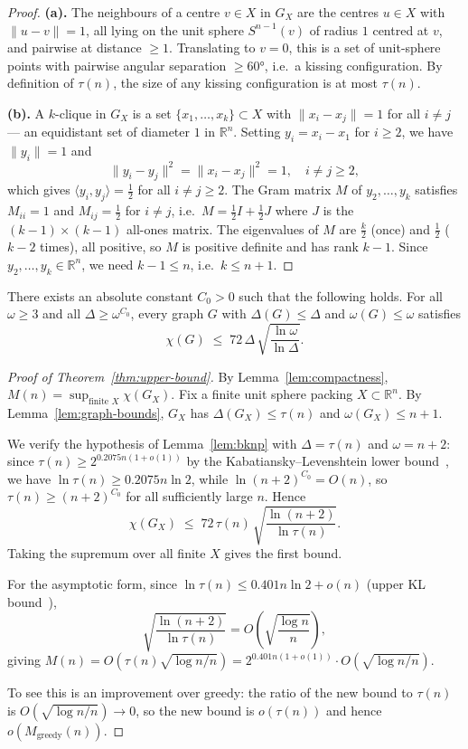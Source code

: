 \begin{proof}
\textbf{(a).} The neighbours of a centre $v\in X$ in $G_X$ are the centres $u\in X$ with $\|u-v\|=1$, all lying on the unit sphere $S^{n-1}(v)$ of radius $1$ centred at $v$, and pairwise at distance $\ge 1$.  Translating to $v=0$, this is a set of unit-sphere points with pairwise angular separation $\ge 60°$, i.e.\ a kissing configuration.  By definition of $\tau(n)$, the size of any kissing configuration is at most $\tau(n)$.

\textbf{(b).} A $k$-clique in $G_X$ is a set $\{x_1,\ldots,x_k\}\subset X$ with $\|x_i-x_j\|=1$ for all $i\ne j$ — an equidistant set of diameter $1$ in $\mathbb{R}^n$.  Setting $y_i=x_i-x_1$ for $i\ge 2$, we have $\|y_i\|=1$ and
\[
  \|y_i-y_j\|^2 = \|x_i-x_j\|^2 = 1, \quad i\ne j\ge 2,
\]
which gives $\langle y_i,y_j\rangle = \tfrac{1}{2}$ for all $i\ne j\ge 2$.  The Gram matrix $M$ of $y_2,\ldots,y_k$ satisfies $M_{ii}=1$ and $M_{ij}=\tfrac{1}{2}$ for $i\ne j$, i.e.\ $M=\tfrac{1}{2}I+\tfrac{1}{2}J$ where $J$ is the $(k-1)\times(k-1)$ all-ones matrix.  The eigenvalues of $M$ are $\tfrac{k}{2}$ (once) and $\tfrac{1}{2}$ ($k-2$ times), all positive, so $M$ is positive definite and has rank $k-1$.  Since $y_2,\ldots,y_k\in\mathbb{R}^n$, we need $k-1\le n$, i.e.\ $k\le n+1$.
\end{proof}

\begin{lemma}\label{lem:bknp}
There exists an absolute constant $C_0>0$ such that the following holds.  For all $\omega\ge 3$ and all $\Delta\ge \omega^{C_0}$, every graph $G$ with $\Delta(G)\le\Delta$ and $\omega(G)\le\omega$ satisfies
\[
  \chi(G)\;\le\; 72\,\Delta\,\sqrt{\frac{\ln\omega}{\ln\Delta}}.
\]
\end{lemma}

\begin{proof}[Proof of Theorem~\ref{thm:upper-bound}]
By Lemma~\ref{lem:compactness}, $M(n)=\sup_{\text{finite }X}\chi(G_X)$.  Fix a finite unit sphere packing $X\subset\mathbb{R}^n$.  By Lemma~\ref{lem:graph-bounds}, $G_X$ has $\Delta(G_X)\le\tau(n)$ and $\omega(G_X)\le n+1$.

We verify the hypothesis of Lemma~\ref{lem:bknp} with $\Delta=\tau(n)$ and $\omega=n+2$: since $\tau(n)\ge 2^{0.2075n(1+o(1))}$ by the Kabatiansky--Levenshtein lower bound~\cite{KL1978}, we have $\ln\tau(n)\ge 0.2075n\ln 2$, while $\ln(n+2)^{C_0}=O(n)$, so $\tau(n)\ge(n+2)^{C_0}$ for all sufficiently large $n$.  Hence
\[
  \chi(G_X) \;\le\; 72\,\tau(n)\,\sqrt{\frac{\ln(n+2)}{\ln\tau(n)}}.
\]
Taking the supremum over all finite $X$ gives the first bound.

For the asymptotic form, since $\ln\tau(n)\le 0.401n\ln 2+o(n)$ (upper KL bound~\cite{KL1978}),
\[
  \sqrt{\frac{\ln(n+2)}{\ln\tau(n)}} = O\!\left(\sqrt{\frac{\log n}{n}}\right),
\]
giving $M(n)=O(\tau(n)\sqrt{\log n/n})=2^{0.401n(1+o(1))}\cdot O(\sqrt{\log n/n})$.

To see this is an improvement over greedy: the ratio of the new bound to $\tau(n)$ is $O(\sqrt{\log n/n})\to 0$, so the new bound is $o(\tau(n))$ and hence $o(M_{\mathrm{greedy}}(n))$.
\end{proof}

